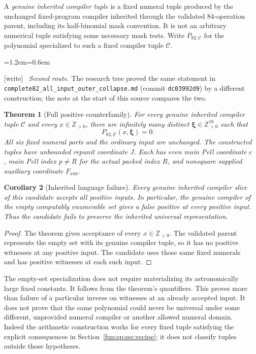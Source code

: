 \documentclass[11pt,letterpaper]{article}
\newtheorem{theorem}{Theorem}[section]
\newtheorem{corollary}[theorem]{Corollary}
\theoremstyle{definition}\newtheorem{definition}[theorem]{Definition}
\theoremstyle{remark}\newtheorem{remark}[theorem]{Remark}
\newcommand{\pos}{\mathbb Z_{>0}}
\newcommand{\Fa}{F_{\mathrm{aux}}}\newcommand{\Ua}{U_{\mathrm{aux}}}\newcommand{\ttt}{t_{\mathrm{tr}}}
\newcommand{\wtag}{\textup{[write]}}
\newenvironment{writenote}{\par\smallskip\begin{list}{}{\leftmargin=1.2em\rightmargin=0.6em}\item[]\small\wtag\ }{\end{list}\smallskip}
\newcommand{\rw}[1]{\nolinkurl{#1}}%
\begin{document}
A \emph{genuine inherited compiler tuple} is a fixed numeral tuple
produced by the unchanged fixed-program compiler inherited through the
validated 84-operation parent, including its half-binomial mask
convention. It is not an arbitrary numerical tuple satisfying some
necessary mask tests. Write $P_{82,\mathcal C}$ for the polynomial
specialized to such a fixed compiler tuple $\mathcal C$.

\begin{writenote}
\emph{Second route.} The research tree proved the same statement in \rw{complete82_all_input_outer_collapse.md} (commit \texttt{dc03992d9}) by a different construction; the note at the start of this source compares the two.
\end{writenote}
\begin{theorem}[Full positive counterfamily]
\label{fup:sp:thm:main}
For every genuine inherited compiler tuple $\mathcal C$ and every
$x\in\pos$, there are infinitely many distinct
$\boldsymbol\xi\in\pos^{18}$ such that
\[
P_{82,\mathcal C}(x,\boldsymbol\xi)=0.
\]
All six fixed numeral ports and the ordinary input are unchanged.
The constructed tuples have unbounded repunit coordinate $J$. Each has
even main Pell coordinate $c$, main Pell index $p\ne R$ for the actual
packed index $R$, and nonsquare supplied auxiliary coordinate $\Fa$.
\end{theorem}

\begin{corollary}[Inherited language failure]
\label{fup:sp:cor:language}
Every genuine inherited compiler slice of this candidate accepts all
positive inputs. In particular, the genuine compiler of the empty
computably enumerable set gives a false positive at every positive
input. Thus the candidate fails to preserve the inherited universal
representation.
\end{corollary}
\begin{proof}
The theorem gives acceptance of every $x\in\pos$. The validated parent
represents the empty set with its genuine compiler tuple, so it has no
positive witnesses at any positive input. The candidate uses those
same fixed numerals and has positive witnesses at each such input.
\end{proof}

The empty-set specialization does not require materializing its
astronomically large fixed constants. It follows from the theorem's
quantifiers. This proves more than failure of a particular inverse on
witnesses at an already accepted input. It does not prove that the same
polynomial could never be universal under some different, unprovided
numeral compiler or another allowed numeral domain. Indeed the arithmetic
construction works for every fixed tuple satisfying the explicit
consequences in Section~\ref{fup:sp:sec:recipe}; it does not classify tuples
outside those hypotheses.
\end{document}
